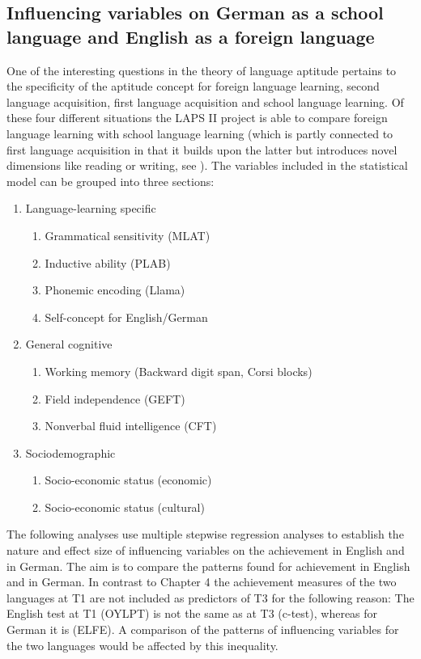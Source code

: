 \documentclass[output=paper]{langsci/langscibook}
\begin{document}
\subsection{Influencing variables on German as a school language and English as a foreign language} %

One of the interesting questions in the theory of language aptitude pertains to the specificity of the aptitude concept for foreign language learning, second language acquisition, first language acquisition and school language learning. Of these four different situations the LAPS II project is able to compare foreign language learning with school language learning (which is partly connected to first language acquisition in that it builds upon the latter but introduces novel dimensions like reading or writing, see ). The variables included in the statistical model can be grouped into three sections:

\begin{enumerate}
\item Language-learning specific
   \begin{enumerate}[label=\alph*.]
   \item Grammatical sensitivity (MLAT)
   \item Inductive ability (PLAB)
   \item Phonemic encoding (Llama)
   \item Self-concept for English/German
   \end{enumerate}
\item General cognitive
   \begin{enumerate}[label=\alph*.]
   \item Working memory (Backward digit span, Corsi blocks)
   \item Field independence (GEFT)
   \item Nonverbal fluid intelligence (CFT)
   \end{enumerate}
\item Sociodemographic
   \begin{enumerate}[label=\alph*.]
   \item Socio-economic status (economic)
   \item Socio-economic status (cultural)
   \end{enumerate}
\end{enumerate}

The following analyses use multiple stepwise regression analyses to establish the nature and effect size of influencing variables on the achievement in English and in German. The aim is to compare the patterns found for achievement in English and in German. In contrast to Chapter 4 the achievement measures of the two languages at T1 are not included as predictors of T3 for the following reason: The English test at T1 (OYLPT) is not the same as at T3 (c-test), whereas for German it is (ELFE). A comparison of the patterns of influencing variables for the two languages would be affected by this inequality. 
\end{document}
